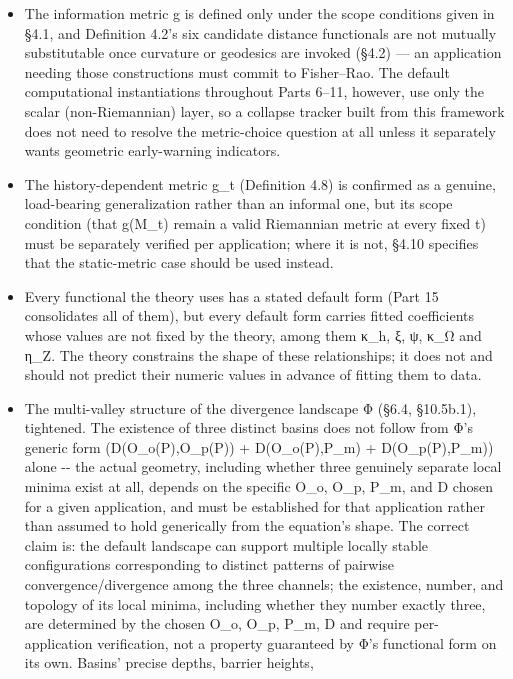 \documentclass[
]{article}
\begin{document}
\begin{itemize}
\item
  The information metric g is defined only under the scope conditions
  given in §4.1, and Definition 4.2's six candidate distance functionals
  are not mutually substitutable once curvature or geodesics are invoked
  (§4.2) --- an application needing those constructions must commit to
  Fisher--Rao. The default computational instantiations throughout Parts
  6--11, however, use only the scalar (non-Riemannian) layer, so a
  collapse tracker built from this framework does not need to resolve
  the metric-choice question at all unless it separately wants geometric
  early-warning indicators.
\item
  The history-dependent metric g\_t (Definition 4.8) is confirmed as a
  genuine, load-bearing generalization rather than an informal one, but
  its scope condition (that g(M\_t) remain a valid Riemannian metric at
  every fixed t) must be separately verified per application; where it
  is not, §4.10 specifies that the static-metric case should be used
  instead.
\item
  Every functional the theory uses has a stated default form (Part 15
  consolidates all of them), but every default form carries fitted
  coefficients whose values are not fixed by the theory, among them
  κ\_h, ξ, ψ, κ\_Ω and η\_Z. The theory constrains the shape of these
  relationships; it does not and should not predict their numeric values
  in advance of fitting them to data.
\item
  The multi-valley structure of the divergence landscape Φ (§6.4,
  §10.5b.1), tightened. The existence of three distinct basins does not
  follow from Φ's generic form (D(O\_o(P),O\_p(P)) + D(O\_o(P),P\_m) +
  D(O\_p(P),P\_m)) alone -\/- the actual geometry, including whether
  three genuinely separate local minima exist at all, depends on the
  specific O\_o, O\_p, P\_m, and D chosen for a given application, and
  must be established for that application rather than assumed to hold
  generically from the equation's shape. The correct claim is: the
  default landscape can support multiple locally stable configurations
  corresponding to distinct patterns of pairwise convergence/divergence
  among the three channels; the existence, number, and topology of its
  local minima, including whether they number exactly three, are
  determined by the chosen O\_o, O\_p, P\_m, D and require
  per-application verification, not a property guaranteed by Φ's
  functional form on its own. Basins' precise depths, barrier heights,

\end{itemize}
\end{document}
